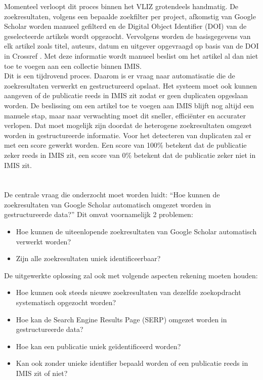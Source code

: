 Momenteel verloopt dit proces binnen het VLIZ grotendeels handmatig. De zoekresultaten, volgens een bepaalde zoekfilter per project, afkomstig van Google Scholar worden manueel gefilterd en de Digital Object Identifier (DOI) van de geselecteerde artikels wordt opgezocht.
Vervolgens worden de basisgegevens van elk artikel zoals titel, auteurs, datum en uitgever opgevraagd op basis van de DOI in Crossref \autocite{Crossref2024}. Met deze informatie wordt manueel beslist om het artikel al dan niet toe te voegen aan een collectie binnen IMIS.\\
Dit is een tijdrovend proces. Daarom is er vraag naar automatisatie die de zoekresultaten verwerkt en gestructureerd opslaat. Het systeem moet ook kunnen aangeven of de publicatie reeds in IMIS zit zodat er geen duplicaten opgeslaan worden. De beslissing om een artikel toe te voegen aan IMIS blijft nog altijd een manuele stap, maar naar verwachting moet dit sneller, efficiënter en accurater verlopen. Dat moet mogelijk zijn doordat de heterogene zoekresultaten omgezet worden in gestructureerde informatie. Voor het detecteren van duplicaten zal er met een score gewerkt worden. Een score van 100\% betekent dat de publicatie zeker reeds in IMIS zit, een score van 0\% betekent dat de publicatie zeker niet in IMIS zit. 

\section{}%
\label{sec:onderzoeksvraag}

De centrale vraag die onderzocht moet worden luidt: ``Hoe kunnen de zoekresultaten van Google Scholar automatisch omgezet worden in gestructureerde data?''
Dit omvat voornamelijk 2 problemen:
\begin{itemize}
    \item Hoe kunnen de uiteenlopende zoekresultaten van Google Scholar automatisch verwerkt worden?
    \item Zijn alle zoekresultaten uniek identificeerbaar?
\end{itemize}
De uitgewerkte oplossing zal ook met volgende aspecten rekening moeten houden:
\begin{itemize}
    \item Hoe kunnen ook steeds nieuwe zoekresultaten van dezelfde zoekopdracht systematisch opgezocht worden?
    \item Hoe kan de Search Engine Results Page (SERP) omgezet worden in gestructureerde data?
    \item Hoe kan een publicatie uniek geïdentificeerd worden?
    \item Kan ook zonder unieke identifier bepaald worden of een publicatie reeds in IMIS zit of niet? 
\end{itemize}

